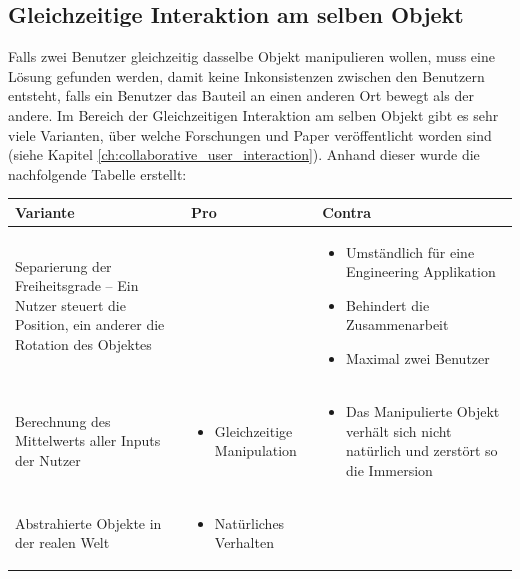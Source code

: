\subsection{Gleichzeitige Interaktion am selben Objekt}
\label{ch:gleichzeitige_interaktion}
Falls zwei Benutzer gleichzeitig dasselbe Objekt manipulieren wollen, muss eine Lösung gefunden werden, damit keine Inkonsistenzen zwischen den Benutzern entsteht, falls ein Benutzer das Bauteil an einen anderen Ort bewegt als der andere. Im Bereich der Gleichzeitigen Interaktion am selben Objekt gibt es sehr viele Varianten, über welche Forschungen und Paper veröffentlicht worden sind (siehe Kapitel \ref{ch:collaborative_user_interaction}). Anhand dieser wurde die nachfolgende Tabelle erstellt:

\begin{center}
	\begin{tabularx} {\textwidth} { | B | B | B | }
		\hline
		\color{white} \textbf{Variante} & \color{white} \textbf{Pro} & 
		\color{white} \textbf{Contra} \\
		\hline
		\vspace{1pt}
		Separierung der Freiheitsgrade – Ein Nutzer steuert die Position, ein anderer die Rotation des Objektes &  &
		\begin{itemize} [leftmargin=*,noitemsep,topsep=0pt]
			\item Umständlich für eine Engineering Applikation
			\item Behindert die Zusammenarbeit
			\item Maximal zwei Benutzer
		\end{itemize} \\
		\hline
		\vspace{1pt}
		Berechnung des Mittelwerts aller Inputs der Nutzer & 
		\begin{itemize} [leftmargin=*,noitemsep,topsep=0pt]
			\item Gleichzeitige Manipulation
		\end{itemize} & 
		\begin{itemize} [leftmargin=*,noitemsep,topsep=0pt]
			\item Das Manipulierte Objekt verhält sich nicht natürlich und zerstört so die Immersion
		\end{itemize} \\
		\hline
		\vspace{1pt}
		Abstrahierte Objekte in der realen Welt & 
		\begin{itemize} [leftmargin=*,noitemsep,topsep=0pt]
			\item Natürliches Verhalten

\end{itemize}
\end{tabularx}
\end{center}
